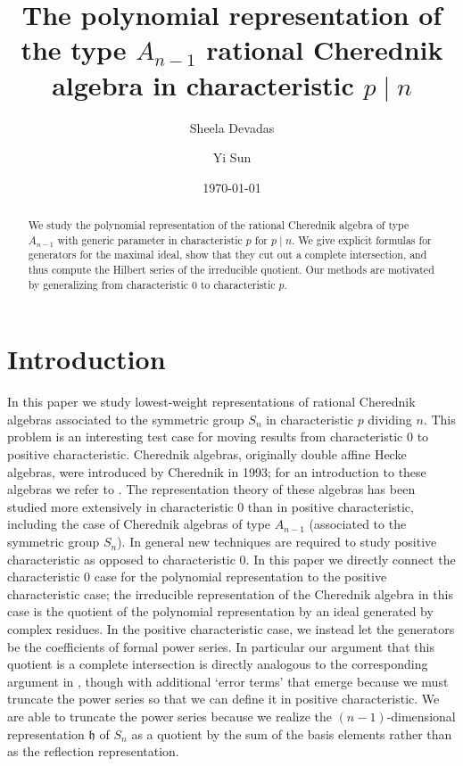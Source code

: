 \documentclass{amsart}
\numberwithin{equation}{section}
\theoremstyle{definition}
\newcommand{\h}{\mathfrak{h}}
\begin{document}
\title[Polynomial representation of type $A_{n - 1}$ rational Cherednik algebra in characteristic $p \mid n$]{The polynomial representation of the type $A_{n - 1}$ rational Cherednik algebra in characteristic $p \mid n$}
\author{Sheela Devadas}
\author{Yi Sun}
\date{\today}

\begin{abstract}
We study the polynomial representation of the rational Cherednik algebra of type $A_{n-1}$ with generic parameter in characteristic $p$ for $p \mid n$. We give explicit formulas for generators for the maximal ideal, show that they cut out a complete intersection, and thus compute the Hilbert series of the irreducible quotient. Our methods are motivated by generalizing from characteristic $0$ to characteristic $p$. 
\end{abstract}

\maketitle

\section{Introduction}

In this paper we study lowest-weight representations of rational Cherednik algebras associated to the symmetric group $S_n$ in characteristic $p$ dividing $n$. This problem is an interesting test case for moving results from characteristic $0$ to positive characteristic. Cherednik algebras, originally double affine Hecke algebras, were introduced by Cherednik in 1993; for an introduction to these algebras we refer to \cite{EM}. The representation theory of these algebras has been studied more extensively in characteristic $0$ than in positive characteristic, including the case of Cherednik algebras of type $A_{n-1}$ (associated to the symmetric group $S_n$). In general new techniques are required to study positive characteristic as opposed to characteristic 0. In this paper we directly connect the characteristic 0 case for the polynomial representation to the positive characteristic case; the irreducible representation of the Cherednik algebra in this case is the quotient of the polynomial representation by an ideal generated by complex residues. In the positive characteristic case, we instead let the generators be the coefficients of formal power series. In particular our argument that this quotient is a complete intersection is directly analogous to the corresponding argument in \cite{CE}, though with additional `error terms' that emerge because we must truncate the power series so that we can define it in positive characteristic. We are able to truncate the power series because we realize the $(n-1)$-dimensional representation $\h$ of $S_n$ as a quotient by the sum of the basis elements rather than as the reflection representation.
\end{document}
